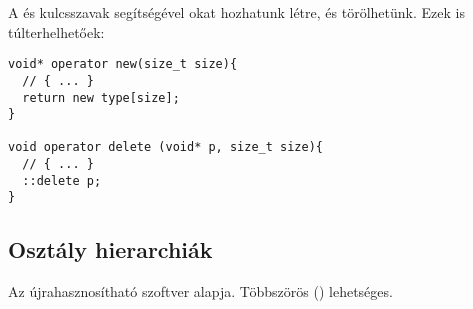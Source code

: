 \documentclass[../../main.tex]{subfiles}
\begin{document}
A  és  kulcsszavak segítségével okat
hozhatunk létre, és törölhetünk. Ezek is túlterhelhetőek:

\begin{verbatim}
void* operator new(size_t size){
  // { ... }
  return new type[size];
}

void operator delete (void* p, size_t size){
  // { ... }
  ::delete p;
}
\end{verbatim}

\subsection{Osztály hierarchiák}

Az újrahasznosítható szoftver alapja. Többszörös 
() lehetséges.
\end{document}
